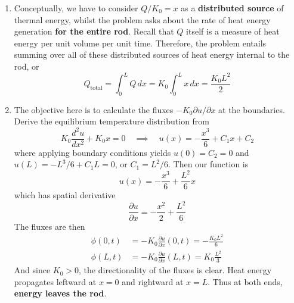 \documentclass[a4paper]{article}
\begin{document}
\newpage

\begin{enumerate}[label=(\alph*)]
	\item Conceptually, we have to consider \( Q / K_{0} = x \) as a \textbf{distributed source} of thermal energy, whilst the problem asks about the rate of heat energy generation \textbf{for the entire rod}. Recall that \( Q \) itself is a measure of heat energy per unit volume per unit time. Therefore, the problem entails summing over all of these distributed sources of heat energy internal to the rod, or
	\[
		Q_{\text{total}} = \int^{L}_{0} Q \, dx = K_{0}\int^{L}_{0} x \, dx = \frac{K_{0}L^{2}}{2} 
	\]
	\item The objective here is to calculate the fluxes \( -K_{0} \partial u / \partial x \) at the boundaries. Derive the equilibrium temperature distribution from 
	\[
		K_{0}\frac{d^{2}u}{dx^{2}} + K_{0}x = 0 \quad \implies \quad u \!\left( x \right) = -\frac{x^{3}}{6} + C_{1}x + C_{2} 
	\]
	where applying boundary conditions yields \( u \!\left( 0 \right) = C_{2} = 0 \) and \( u \!\left( L \right) = -L^{3} / 6 + C_{1}L = 0 \), or \( C_{1} = L^{2} / 6 \). Then our function is
	\[
		u \!\left( x \right) = -\frac{x^{3}}{6} + \frac{L^{2}}{6}x 
	\]
	which has spatial derivative
	\[
		\frac{\partial u}{\partial x} = -\frac{x^{2}}{2} + \frac{L^{2}}{6} 
	\]
	The fluxes are then
	\begin{align*}
		\phi \!\left( 0,t \right) & = -K_{0}\frac{\partial u}{\partial x}\!\left( 0,t \right) = -\frac{K_{0}L^{2}}{6} \\
		\phi \!\left( L,t \right) & = -K_{0}\frac{\partial u}{\partial x}\!\left( L,t \right) = K_{0} \frac{L^{2}}{3}
	\end{align*}
	And since \( K_{0} > 0 \), the directionality of the fluxes is clear. Heat energy propagates leftward at \( x = 0 \) and rightward at \( x = L \). Thus at both ends, \textbf{energy leaves the rod}.

\end{enumerate}
\end{document}
